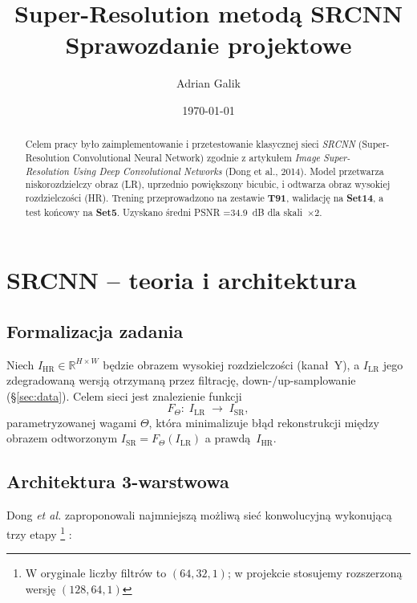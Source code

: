 \documentclass[11pt]{article}
\title{\textbf{Super-Resolution metodą SRCNN}\\%
       \large Sprawozdanie projektowe}
\author{Adrian Galik}
\date{\today}
\begin{document}
\maketitle
\begin{abstract}
\noindent Celem pracy było zaimplementowanie i przetestowanie klasycznej sieci
\emph{SRCNN} (Super-Resolution Convolutional Neural Network) zgodnie z artykułem
\emph{Image Super-Resolution Using Deep Convolutional Networks} (Dong et al.,
2014).  Model przetwarza niskorozdzielczy obraz (LR), uprzednio powiększony
bicubic, i odtwarza obraz wysokiej rozdzielczości (HR).  Trening przeprowadzono
na zestawie \textbf{T91}, walidację na \textbf{Set14}, a test końcowy na
\textbf{Set5}.  Uzyskano średni PSNR =\SI{34.9}{dB} dla skali~$\times2$.
\end{abstract}

\section{SRCNN – teoria i architektura}
\label{sec:srcnn}

\subsection{Formalizacja zadania}

Niech $I_\mathrm{HR}\!\in\!\mathbb R^{H\times W}$ będzie obrazem
wysokiej rozdzielczości (kanał~Y), a $I_\mathrm{LR}$ jego
zdegradowaną wersją otrzymaną przez filtrację, down-/up-samplowanie
(\S\ref{sec:data}).  
Celem sieci jest znalezienie funkcji
\begin{equation}
  F_\Theta : \; I_\mathrm{LR}\;\longrightarrow\; I_\mathrm{SR},
\end{equation}
parametryzowanej wagami $\Theta$, która minimalizuje błąd rekonstrukcji
między obrazem odtworzonym $I_\mathrm{SR}=F_\Theta(I_\mathrm{LR})$ a prawdą
$\,I_\mathrm{HR}$.

\subsection{Architektura 3-warstwowa \cite{dong2014}}

Dong \emph{et al.} zaproponowali najmniejszą możliwą sieć
konwolucyjną wykonującą trzy etapy
\footnote{
W oryginale liczby filtrów to $(64,32,1)$; w projekcie stosujemy
rozszerzoną wersję $(128,64,1)$
 }
 :
\end{document}
